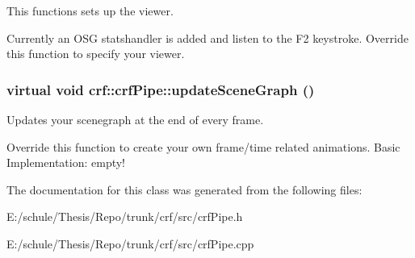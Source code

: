 This functions sets up the viewer. 

Currently an OSG statshandler is added and listen to the F2 keystroke. Override this function to specify your viewer. \hypertarget{a00006_5288fedad120ffd32f3290b4c91065b7}{
\subsubsection[{updateSceneGraph}]{\setlength{\rightskip}{0pt plus 5cm}virtual void crf::crfPipe::updateSceneGraph ()}}
\label{a00006_5288fedad120ffd32f3290b4c91065b7}


Updates your scenegraph at the end of every frame. 

Override this function to create your own frame/time related animations. Basic Implementation: empty! 

The documentation for this class was generated from the following files:\begin{CompactItemize}
\item 
E:/schule/Thesis/Repo/trunk/crf/src/crfPipe.h\item 
E:/schule/Thesis/Repo/trunk/crf/src/crfPipe.cpp\end{CompactItemize}
